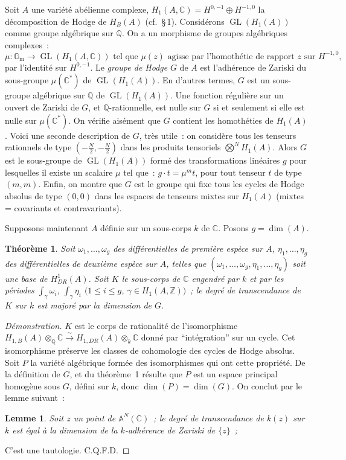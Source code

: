 \documentclass[12pt,a4paper]{article}
\theoremstyle{plain}
\newtheorem{theorem}{Théorème}
\newtheorem{lemma}{Lemme}
\theoremstyle{definition}
\theoremstyle{remark}
\newcommand{\ZZ}{\mathbb{Z}}
\newcommand{\QQ}{\mathbb{Q}}
\newcommand{\CC}{\mathbb{C}}
\newcommand{\Gm}{\mathbb{G}_\mathrm{m}}
\providecommand{\AA}{\mathbb{A}}
\providecommand{\CC}{\mathbb{C}}
\providecommand{\QQ}{\mathbb{Q}}
\providecommand{\ZZ}{\mathbb{Z}}
\providecommand{\Gm}{\mathbb{G}_{\mathrm m}}
\providecommand{\GL}{\operatorname{GL}}
\begin{document}
Soit $A$ une variété abélienne complexe, $H_1(A, \CC) = H^{0,-1} \oplus H^{-1,0}$ la décomposition de Hodge de $H_B(A)$ (cf.~\S\,1). Considérons $\GL(H_1(A))$ comme groupe algébrique sur $\QQ$. On a un morphisme de groupes algébriques complexes~:
\[
\mu : \Gm \to \GL(H_1(A, \CC)) \text{ tel que } \mu(z) \text{ agisse par l'homothétie de rapport } z \text{ sur } H^{-1,0},
\]
par l'identité sur $H^{0,-1}$. Le \emph{groupe de Hodge} $G$ de $A$ est l'adhérence de Zariski du sous-groupe $\mu(\CC^*)$ de $\GL(H_1(A))$. En d'autres termes, $G$ est un sous-groupe algébrique sur $\QQ$ de $\GL(H_1(A))$. Une fonction régulière sur un ouvert de Zariski de $G$, et $\QQ$-rationnelle, est nulle sur $G$ si et seulement si elle est nulle sur $\mu(\CC^*)$. On vérifie aisément que $G$ contient les homothéties de $H_1(A)$. Voici une seconde description de $G$, très utile~: on considère tous les tenseurs rationnels de type $(-\frac{N}{2}, -\frac{N}{2})$ dans les produits tensoriels $\bigotimes^N H_1(A)$. Alors $G$ est le sous-groupe de $\GL(H_1(A))$ formé des transformations linéaires $g$ pour lesquelles il existe un scalaire $\mu$ tel que~: $g \cdot t = \mu^m t$, pour tout tenseur $t$ de type $(m,m)$. Enfin, on montre que $G$ est le groupe qui fixe tous les cycles de Hodge absolus de type $(0,0)$ dans les espaces de tenseurs mixtes sur $H_1(A)$ (mixtes = covariants et contravariants).

Supposons maintenant $A$ définie sur un sous-corps $k$ de $\CC$. Posons $g = \dim(A)$.

\begin{theorem}
Soit $\omega_1, \ldots, \omega_g$ des différentielles de première espèce sur $A$, $\eta_1, \ldots, \eta_g$ des différentielles de deuxième espèce sur $A$, telles que $(\omega_1, \ldots, \omega_g, \eta_1, \ldots, \eta_g)$ soit une base de $H^1_{DR}(A)$. Soit $K$ le sous-corps de $\CC$ engendré par $k$ et par les périodes $\int_\gamma \omega_i$, $\int_\gamma \eta_i$ $(1 \leq i \leq g$, $\gamma \in H_1(A, \ZZ))$~; le degré de transcendance de $K$ sur $k$ est majoré par la dimension de $G$.
\end{theorem}

\begin{proof}[Démonstration]
$K$ est le corps de rationalité de l'isomorphisme $H_{1,B}(A) \otimes_\QQ \CC \xrightarrow{\sim} H_{1,DR}(A) \otimes_k \CC$ donné par ``intégration'' sur un cycle. Cet isomorphisme préserve les classes de cohomologie des cycles de Hodge absolus. Soit $P$ la variété algébrique formée des isomorphismes qui ont cette propriété. De la définition de $G$, et du théorème~1 résulte que $P$ est un espace principal homogène sous $G$, défini sur $k$, donc $\dim(P) = \dim(G)$. On conclut par le lemme suivant~:

\begin{lemma}
Soit $z$ un point de $\AA^N(\CC)$~; le degré de transcendance de $k(z)$ sur $k$ est égal à la dimension de la $k$-adhérence de Zariski de $\{z\}$~;
\end{lemma}
\noindent C'est une tautologie. \hfill C.Q.F.D.
\end{proof}
\end{document}
